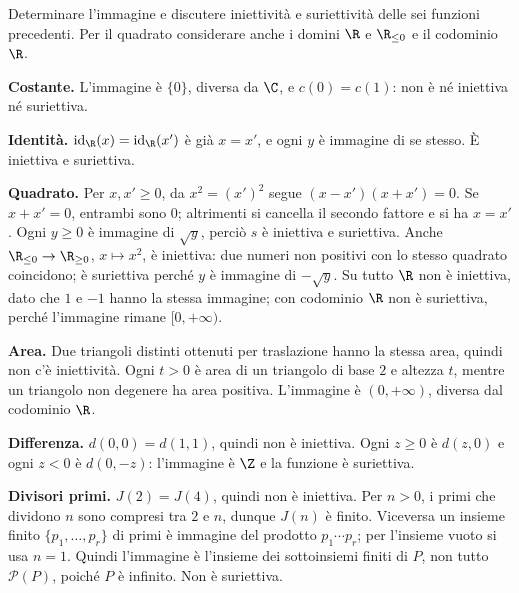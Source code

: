 \begin{esercizio}
Determinare l'immagine e discutere iniettività e suriettività delle sei funzioni precedenti. Per il quadrato considerare anche i domini $\R$ e $\R_{\le0}$ e il codominio $\R$.
\end{esercizio}
\begin{svolgimento}
\textbf{Costante.} L'immagine è $\{0\}$, diversa da $\C$, e $c(0)=c(1)$: non è né iniettiva né suriettiva.

\textbf{Identità.} $\operatorname{id}_{\R}(x)=\operatorname{id}_{\R}(x')$ è già $x=x'$, e ogni $y$ è immagine di se stesso. È iniettiva e suriettiva.

\textbf{Quadrato.} Per $x,x'\ge0$, da $x^2=(x')^2$ segue $(x-x')(x+x')=0$. Se $x+x'=0$, entrambi sono $0$; altrimenti si cancella il secondo fattore e si ha $x=x'$. Ogni $y\ge0$ è immagine di $\sqrt y$, perciò $s$ è iniettiva e suriettiva. Anche $\R_{\le0}\to\R_{\ge0}$, $x\mapsto x^2$, è iniettiva: due numeri non positivi con lo stesso quadrato coincidono; è suriettiva perché $y$ è immagine di $-\sqrt y$. Su tutto $\R$ non è iniettiva, dato che $1$ e $-1$ hanno la stessa immagine; con codominio $\R$ non è suriettiva, perché l'immagine rimane $[0,+\infty)$.

\textbf{Area.} Due triangoli distinti ottenuti per traslazione hanno la stessa area, quindi non c'è iniettività. Ogni $t>0$ è area di un triangolo di base $2$ e altezza $t$, mentre un triangolo non degenere ha area positiva. L'immagine è $(0,+\infty)$, diversa dal codominio $\R$.

\textbf{Differenza.} $d(0,0)=d(1,1)$, quindi non è iniettiva. Ogni $z\ge0$ è $d(z,0)$ e ogni $z<0$ è $d(0,-z)$: l'immagine è $\Z$ e la funzione è suriettiva.

\textbf{Divisori primi.} $J(2)=J(4)$, quindi non è iniettiva. Per $n>0$, i primi che dividono $n$ sono compresi tra $2$ e $n$, dunque $J(n)$ è finito. Viceversa un insieme finito $\{p_1,\ldots,p_r\}$ di primi è immagine del prodotto $p_1\cdots p_r$; per l'insieme vuoto si usa $n=1$. Quindi l'immagine è l'insieme dei sottoinsiemi finiti di $P$, non tutto $\mathcal P(P)$, poiché $P$ è infinito. Non è suriettiva.
\end{svolgimento}

